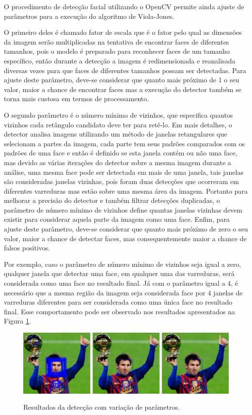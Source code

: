 O procedimento de detecção facial utilizando o OpenCV permite ainda ajuste de parâmetros para a execução do algoritmo de Viola-Jones.

O primeiro deles é chamado fator de escala que é o fator pelo qual as dimensões da imagem serão multiplicadas na tentativa de encontrar faces de diferentes tamanhos, pois o modelo é preparado para reconhecer faces de um tamanho específico, então durante a detecção a imagem é redimensionada e reanalisada diversas vezes para que faces de diferentes tamanhos possam ser detectadas. Para ajuste deste parâmetro, deve-se considerar que quanto mais próximo de 1 o seu valor, maior a chance de encontrar faces mas a execução do detector também se torna mais custosa em termos de processamento.

O segundo parâmetro é o número mínimo de vizinhos, que especifica quantos vizinhos cada retângulo candidato deve ter para retê-lo. Em mais detalhes, o detector analisa imagens utilizando um método de janelas retangulares que selecionam a partes da imagem, cada parte tem seus padrões comparados com os padrões de uma face e então é definido se esta janela contém ou não uma face, mas devido as várias iterações do detector sobre a mesma imagem durante a análise, uma mesma face pode ser detectada em mais de uma janela, tais janelas são consideradas janelas vizinhas, pois foram duas detecções que ocorreram em diferentes varreduras mas estão sobre uma mesma área da imagem. Portanto para melhorar a precisão do detector e também filtrar detecções duplicadas, o parâmetro de número mínimo de vizinhos define quantas janelas vizinhas devem existir para considerar aquela parte da imagem como uma face. Enfim, para ajuste deste parâmetro, deve-se considerar que quanto mais próximo de zero o seu valor, maior a chance de detectar faces, mas consequentemente maior a chance de falsos positivos.

Por exemplo, caso o parâmetro de número mínimo de vizinhos seja igual a zero, qualquer janela que detectar uma face, em qualquer uma das varreduras, será considerada como uma face no resultado final. Já com o parâmetro igual a 4, é necessário que a mesma região da imagem seja considerada face por 4 janelas de varreduras diferentes para ser considerada como uma única face no resultado final. Esse comportamento pode ser observado nos resultados apresentados na Figura \ref{fig:min-neighbors-messi}.

\begin{figure}[htb]
    \centering
    \caption{Resultados da detecção com variação de parâmetros.}
    \includegraphics[scale=.2]{figs/min_neighbors_messi.png}
    \label{fig:min-neighbors-messi}
\end{figure}

